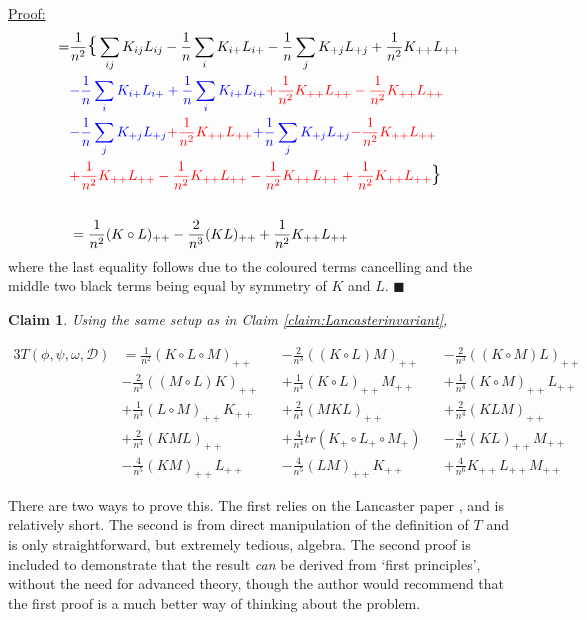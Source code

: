\documentclass[12pt]{article}
\newtheorem{claim}{Claim}
\newenvironment{claimproof}[1]{\par\noindent\underline{Proof:}\space#1}{\hfill $\blacksquare$}
\numberwithin{claim}{section}
\numberwithin{lemma}{section}
\numberwithin{theorem}{section}
\begin{document}
\begin{claimproof}
\begin{align*}
=& \frac{1}{n^2} \mathlarger{\mathlarger{\{}} 
\sum_{ij} K_{ij}L_{ij} - \frac{1}{n} \sum_i K_{i+}L_{i+} - \frac{1}{n} \sum_j K_{+j}L_{+j} + \frac{1}{n^2}K_{++}L_{++} \\
& \textcolor{blue}{- \frac{1}{n} \sum_i K_{i+}L_{i+} + \frac{1}{n} \sum_iK_{i+}L_{i+}} \textcolor{red}{+ \frac{1}{n^2}K_{++}L_{++} - \frac{1}{n^2} K_{++}L_{++}}\\
& \textcolor{blue}{-  \frac{1}{n}\sum_j K_{+j}L_{+j}} \textcolor{red}{+ \frac{1}{n^2}K_{++} L_{++}}  \textcolor{blue}{+\frac{1}{n}\sum_j K_{+j} L_{+j}} \textcolor{red}{ -\frac{1}{n^2} K_{++} L_{++}}\\
&\textcolor{red}{ + \frac{1}{n^2} K_{++}L_{++} - \frac{1}{n^2}K_{++} L_{++} - \frac{1}{n^2}K_{++}L_{++} + \frac{1}{n^2}K_{++} L_{++}} \mathlarger{\mathlarger{\}}}\\ \\
& = \frac{1}{n^2} (K\circ L)_{++} - \frac{2}{n^3} (KL)_{++} + \frac{1}{n^2} K_{++}L_{++}
\end{align*}
where the last equality follows due to the coloured terms cancelling and the middle two black terms being equal by symmetry of $K$ and $L$.
\end{claimproof}

\begin{claim}\label{claim:LancasterT}
Using the same setup as in Claim \ref{claim:Lancasterinvariant},

\begin{alignat*}{3}
T(\phi,\psi,\omega,\mathcal{D}) &= \frac{1}{n^2}(K \circ L\circ M)_{++} && -
\frac{2}{n^3}((K\circ L) M)_{++} && - 
\frac{2}{n^3}((K \circ M) L)_{++} \\ & - 
\frac{2}{n^3}((M \circ L) K)_{++} && + 
\frac{1}{n^4}(K \circ L)_{++} M_{++} && + 
\frac{1}{n^4}(K \circ M)_{++} L_{++} \\ & + 
\frac{1}{n^4}(L \circ M)_{++} K_{++} && + 
\frac{2}{n^4}(MKL)_{++} && + 
\frac{2}{n^4}(KLM)_{++} \\& + 
\frac{2}{n^4}(KML)_{++} && + 
\frac{4}{n^4}tr(K_+ \circ L_+ \circ M_+) && -
\frac{4}{n^5}(K L)_{++} M_{++} \\ & - 
\frac{4}{n^5}(KM)_{++}L_{++} && - 
\frac{4}{n^5}(LM)_{++} K_{++} && +
\frac{4}{n^6}K_{++} L_{++} M_{++}
\end{alignat*}
\end{claim}


There are two ways to prove this. The first relies on the Lancaster paper \cite{sejdinovic2013kernel}, and is relatively short. The second is from direct manipulation of the definition of $T$ and is only straightforward, but extremely tedious, algebra. The second proof is included to demonstrate that the result \emph{can} be derived from `first principles', without the need for advanced theory, though the author would recommend that the first proof is a much better way of thinking about the problem.
\end{document}
